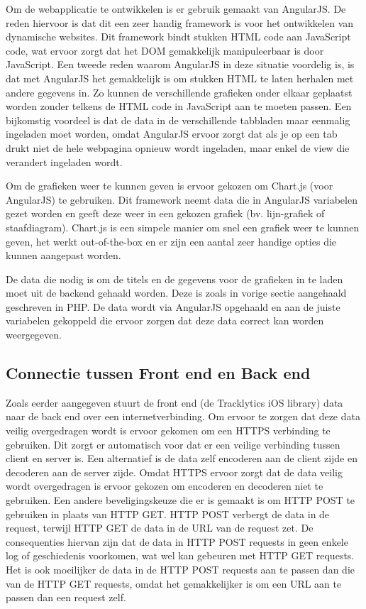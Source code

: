 Om de webapplicatie te ontwikkelen is er gebruik gemaakt van AngularJS. De reden hiervoor is dat dit een zeer handig framework is voor het ontwikkelen van dynamische websites. Dit framework bindt stukken HTML code aan JavaScript code, wat ervoor zorgt dat het DOM gemakkelijk manipuleerbaar is door JavaScript. Een tweede reden waarom AngularJS in deze situatie voordelig is, is dat met AngularJS het gemakkelijk is om stukken HTML te laten herhalen met andere gegevens in. Zo kunnen de verschillende grafieken onder elkaar geplaatst worden zonder telkens de HTML code in JavaScript aan te moeten passen. Een bijkomstig voordeel is dat de data in de verschillende tabbladen maar eenmalig ingeladen moet worden, omdat AngularJS ervoor zorgt dat als je op een tab drukt niet de hele webpagina opnieuw wordt ingeladen, maar enkel de view die verandert ingeladen wordt.

Om de grafieken weer te kunnen geven is ervoor gekozen om Chart.js (voor AngularJS) te gebruiken. Dit framework neemt data die in AngularJS variabelen gezet worden en geeft deze weer in een gekozen grafiek (bv. lijn-grafiek of staafdiagram). Chart.js is een simpele manier om snel een grafiek weer te kunnen geven, het werkt out-of-the-box en er zijn een aantal zeer handige opties die kunnen aangepast worden. 

De data die nodig is om de titels en de gegevens voor de grafieken in te laden moet uit de backend gehaald worden. Deze is zoals in vorige sectie aangehaald geschreven in PHP. De data wordt via AngularJS opgehaald en aan de juiste variabelen gekoppeld die ervoor zorgen dat deze data correct kan worden weergegeven.\\ 

\subsection{Connectie tussen Front end en Back end}
Zoals eerder aangegeven stuurt de front end (de Tracklytics iOS library) data naar de back end over een internetverbinding. Om ervoor te zorgen dat deze data veilig overgedragen wordt is ervoor gekomen om een HTTPS verbinding te gebruiken. Dit zorgt er automatisch voor dat er een veilige verbinding tussen client en server is. Een alternatief is de data zelf encoderen aan de client zijde en decoderen aan de server zijde. Omdat HTTPS ervoor zorgt dat de data veilig wordt overgedragen is ervoor gekozen om encoderen en decoderen niet te gebruiken.
Een andere beveligingskeuze die er is gemaakt is om HTTP POST te gebruiken in plaats van HTTP GET. HTTP POST verbergt de data in de request, terwijl HTTP GET de data in de URL van de request zet. De consequenties hiervan zijn dat de data in HTTP POST requests in geen enkele log of geschiedenis voorkomen, wat wel kan gebeuren met HTTP GET requests. Het is ook moeilijker de data in de HTTP POST requests aan te passen dan die van de HTTP GET requests, omdat het gemakkelijker is om een URL aan te passen dan een request zelf.\\

